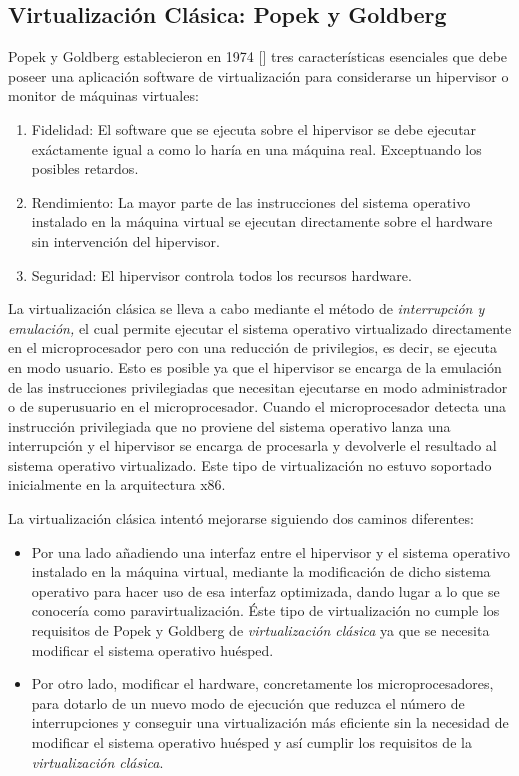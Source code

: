 \documentclass[spanisheDIVcalc,twoside,parskip-,pointlessnumbers,final]{scrbook}
\begin{document}
\subsection{Virtualización Clásica: Popek y Goldberg}

Popek y Goldberg establecieron en 1974 [\cite{Popek:1974:FRV:361011.361073}] tres características
esenciales que debe poseer una aplicación software de virtualización
para considerarse un hipervisor o monitor de máquinas virtuales:
\begin{enumerate}
\item Fidelidad: El software que se ejecuta sobre el hipervisor se debe
ejecutar exáctamente igual a como lo haría en una máquina real. Exceptuando
los posibles retardos.
\item Rendimiento: La mayor parte de las instrucciones del sistema operativo
instalado en la máquina virtual se ejecutan directamente sobre el
hardware sin intervención del hipervisor.
\item Seguridad: El hipervisor controla todos los recursos hardware.
\end{enumerate}
La virtualización clásica se lleva a cabo mediante el método de \emph{interrupción
y emulación, }el cual permite ejecutar el sistema operativo virtualizado
directamente en el microprocesador pero con una reducción de privilegios,
es decir, se ejecuta en modo usuario. Esto es posible ya que el hipervisor
se encarga de la emulación de las instrucciones privilegiadas que
necesitan ejecutarse en modo administrador o de superusuario en el
microprocesador. Cuando el microprocesador detecta una instrucción
privilegiada que no proviene del sistema operativo lanza una interrupción
y el hipervisor se encarga de procesarla y devolverle el resultado
al sistema operativo virtualizado. Este tipo de virtualización no
estuvo soportado inicialmente en la arquitectura x86.

La virtualización clásica intentó mejorarse siguiendo dos caminos
diferentes:
\begin{itemize}
\item Por una lado añadiendo una interfaz entre el hipervisor y el sistema
operativo instalado en la máquina virtual, mediante la modificación
de dicho sistema operativo para hacer uso de esa interfaz optimizada,
dando lugar a lo que se conocería como paravirtualización. Éste tipo
de virtualización no cumple los requisitos de Popek y Goldberg de
\emph{virtualización clásica} ya que se necesita modificar el sistema
operativo huésped. 
\item Por otro lado, modificar el hardware, concretamente los microprocesadores,
para dotarlo de un nuevo modo de ejecución que reduzca el número de
interrupciones y conseguir una virtualización más eficiente sin la
necesidad de modificar el sistema operativo huésped y así cumplir
los requisitos de la \emph{virtualización clásica}.
\end{itemize}
\end{document}
